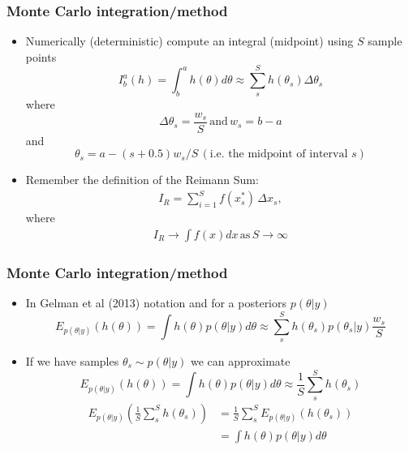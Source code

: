 \documentclass[10pt]{beamer}
\begin{document}
\begin{frame}
\frametitle{Monte Carlo integration/method}

  \begin{itemize}
    \item Numerically (deterministic) compute an integral (midpoint) using $S$ sample points
    \[
      I^a_b(h) = \int^a_b h(\theta) d\theta \approx \sum_s^S h(\theta_s) \Delta \theta_s
    \]
    where
    \[
    \Delta \theta_s = \frac{w_s}{S}\, \text{and} \, w_s = b - a
    \]
    and
    \[
    \theta_s = a - (s + 0.5) w_s / S \, (\text{i.e. the midpoint of interval }s)
    \]
    \pause
   \item Remember the definition of the Reimann Sum:
   \begin{align*}
   {\displaystyle I_R=\sum _{i=1}^{S}f(x_{s}^{*})\,\Delta x_{s},}
     \end{align*}
   where
      \begin{align*}
   {\displaystyle I_R \rightarrow \int f(x) dx \, \text{as} \, S \rightarrow \infty}
  \end{align*}

  \end{itemize}

\end{frame}

\begin{frame}
\frametitle{Monte Carlo integration/method}

  \begin{itemize}
    \item In Gelman et al (2013) notation and for a posteriors $p(\theta|y)$
    \[
      E_{p(\theta|y)}(h(\theta)) = \int h(\theta) p(\theta|y) d\theta \approx \sum_s^S h(\theta_s) p(\theta_s|y) \frac{w_s}{S}
    \]
    \pause
    \item If we have samples $\theta_s \sim p(\theta|y)$ we can approximate
        \[
      E_{p(\theta|y)}(h(\theta)) = \int h(\theta) p(\theta|y) d\theta \approx \frac{1}{S} \sum_s^S h(\theta_s)
    \]
    \pause
    \begin{align*}
    E_{p(\theta|y)}\left( \frac{1}{S}\sum_s^S h(\theta_s)\right) & = \frac{1}{S} \sum_s^S E_{p(\theta|y)}  \left( h(\theta_s)\right) \\
    & = \int h(\theta) p(\theta|y) d\theta
    \end{align*}
  \end{itemize}


\end{frame}
\end{document}
